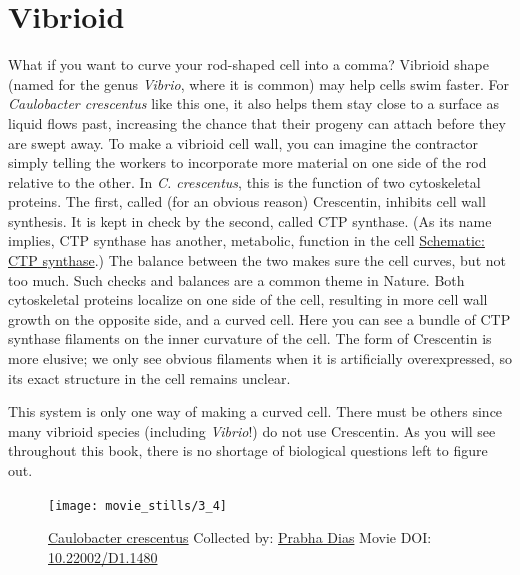 \documentclass[]{tufte-book}
\begin{document}
\section{Vibrioid}\label{vibrioid}

What if you want to curve your rod-shaped cell into a comma? Vibrioid
shape (named for the genus \emph{Vibrio}, where it is common) may help
cells swim faster. For \emph{Caulobacter crescentus} like this one, it
also helps them stay close to a surface as liquid flows past, increasing
the chance that their progeny can attach before they are swept away. To
make a vibrioid cell wall, you can imagine the contractor simply telling
the workers to incorporate more material on one side of the rod relative
to the other. In \emph{C. crescentus}, this is the function of two
cytoskeletal proteins. The first, called (for an obvious reason)
Crescentin, inhibits cell wall synthesis. It is kept in check by the
second, called CTP synthase. (As its name implies, CTP synthase has
another, metabolic, function in the cell
\protect\hyperlink{CTP_synthase}{Schematic: CTP synthase}.) The balance
between the two makes sure the cell curves, but not too much. Such
checks and balances are a common theme in Nature. Both cytoskeletal
proteins localize on one side of the cell, resulting in more cell wall
growth on the opposite side, and a curved cell. Here you can see a
bundle of CTP synthase filaments on the inner curvature of the cell. The
form of Crescentin is more elusive; we only see obvious filaments when
it is artificially overexpressed, so its exact structure in the cell
remains unclear.

This system is only one way of making a curved cell. There must be
others since many vibrioid species (including \emph{Vibrio}!) do not use
Crescentin. As you will see throughout this book, there is no shortage
of biological questions left to figure out.





\begin{figure}
\texttt{[image: movie\_stills/3\_4]} \caption[\protect\hyperlink{tree}{Caulobacter crescentus} Collected by:
\protect\hyperlink{prabha_dias}{Prabha Dias} Movie DOI:
\href{https://doi.org/10.22002/D1.1480}{10.22002/D1.1480}]{\protect\hyperlink{tree}{Caulobacter crescentus} Collected by:
\protect\hyperlink{prabha_dias}{Prabha Dias} Movie DOI:
\href{https://doi.org/10.22002/D1.1480}{10.22002/D1.1480}}\label{fig:3-4}
\end{figure}
\end{document}
